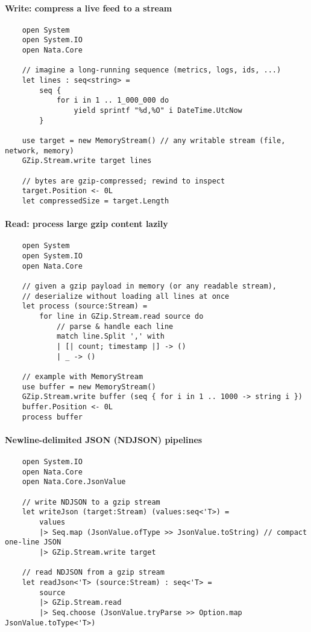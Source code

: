 \documentclass{article}
\begin{document}
\paragraph{Write: compress a live feed to a stream}
\begin{verbatim}
    open System
    open System.IO
    open Nata.Core

    // imagine a long-running sequence (metrics, logs, ids, ...)
    let lines : seq<string> =
        seq {
            for i in 1 .. 1_000_000 do
                yield sprintf "%d,%O" i DateTime.UtcNow
        }

    use target = new MemoryStream() // any writable stream (file, network, memory)
    GZip.Stream.write target lines

    // bytes are gzip-compressed; rewind to inspect
    target.Position <- 0L
    let compressedSize = target.Length
\end{verbatim}

\paragraph{Read: process large gzip content lazily}
\begin{verbatim}
    open System
    open System.IO
    open Nata.Core

    // given a gzip payload in memory (or any readable stream),
    // deserialize without loading all lines at once
    let process (source:Stream) =
        for line in GZip.Stream.read source do
            // parse & handle each line
            match line.Split ',' with
            | [| count; timestamp |] -> ()
            | _ -> ()

    // example with MemoryStream
    use buffer = new MemoryStream()
    GZip.Stream.write buffer (seq { for i in 1 .. 1000 -> string i })
    buffer.Position <- 0L
    process buffer
\end{verbatim}

\paragraph{Newline-delimited JSON (NDJSON) pipelines}
\begin{verbatim}
    open System.IO
    open Nata.Core
    open Nata.Core.JsonValue

    // write NDJSON to a gzip stream
    let writeJson (target:Stream) (values:seq<'T>) =
        values
        |> Seq.map (JsonValue.ofType >> JsonValue.toString) // compact one-line JSON
        |> GZip.Stream.write target

    // read NDJSON from a gzip stream
    let readJson<'T> (source:Stream) : seq<'T> =
        source
        |> GZip.Stream.read
        |> Seq.choose (JsonValue.tryParse >> Option.map JsonValue.toType<'T>)
\end{verbatim}
\end{document}
